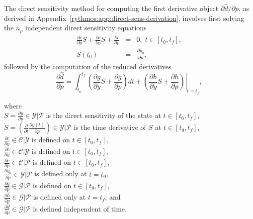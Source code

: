 \documentclass[pdf,ps2pdf,11pt]{SANDreport}
\begin{document}
The direct sensitivity method for computing the first derivative object
$\partial {}\hat{d} / {}\partial p$, as derived in
Appendix~\ref{rythmos:app:direct-sens-derivation}, involves first solving the
$n_p$ independent direct sensitivity equations
%
\begin{eqnarray}
%
\frac{\partial c}{\partial \dot{y}} \dot{S} + \frac{\partial c}{\partial y} S + \frac{\partial c}{\partial p}
& = & 0, \; t \in \left[ t_0, t_f \right], \label{rythmos:eqn:sens:direct-c} \\
S(t_0) & = & \frac{\partial y_0}{\partial p}. \label{rythmos:eqn:sens:direct-c:ic}
\end{eqnarray}
%
followed by the computation of the reduced derivatives
%
\begin{equation}
\frac{\partial \hat{d}}{\partial p} 
= \int_{t_0}^{t_f} \left( \frac{\partial g}{\partial y} S +  \frac{\partial g}{\partial p} \right) dt
+ \left. \left(  \frac{\partial h}{\partial y} S + \frac{\partial h}{\partial p} \right) \right|_{t=t_f},
\label{rythmos:eqn:sens:d_d_hat_d_p_2}
\end{equation}
%
\begin{tabbing}
\hspace{4ex}where\hspace{1ex}\= \\
\> $S = \frac{\partial y}{\partial p} {}\in {}\mathcal{Y}|\mathcal{P}$ is the
direct sensitivity of the state at $t\in[t_0,t_f]$, \\
\> $\dot{S} = \left(\frac{\partial}{\partial t} \frac{\partial y(t)}{\partial p}\right)
{}\in {}\mathcal{Y}|\mathcal{P}$ is the time derivative of $S$ at $t\in[t_0,t_f]$, \\
\> $\frac{\partial c}{\partial {}\dot{y}} {}\in {}\mathcal{C}|\mathcal{Y}$ is defined on
$t\in[t_0,t_f]$, \\
\> $\frac{\partial c}{\partial y} {}\in {}\mathcal{C}|\mathcal{Y}$ is defined on $t\in[t_0,t_f]$, \\
\> $\frac{\partial c}{\partial p} {}\in {}\mathcal{C}|\mathcal{P}$ is defined on $t\in[t_0,t_f]$, \\
\> $\frac{\partial y_0}{\partial p} {}\in {}\mathcal{Y}|\mathcal{P}$ is defined only at $t=t_0$, \\
\> $\frac{\partial {}\hat{g}}{\partial p} {}\in {}\mathcal{G}|\mathcal{P}$ is defined on $t\in[t_0,t_f]$, \\
\> $\frac{\partial {}\hat{h}}{\partial p} {}\in {}\mathcal{G}|\mathcal{P}$ is defined only at $t=t_f$, and \\
\> $\frac{\partial {}\hat{d}}{\partial p} {}\in {}\mathcal{G}|\mathcal{P}$ is defined independent of time.
\end{tabbing}
\end{document}
